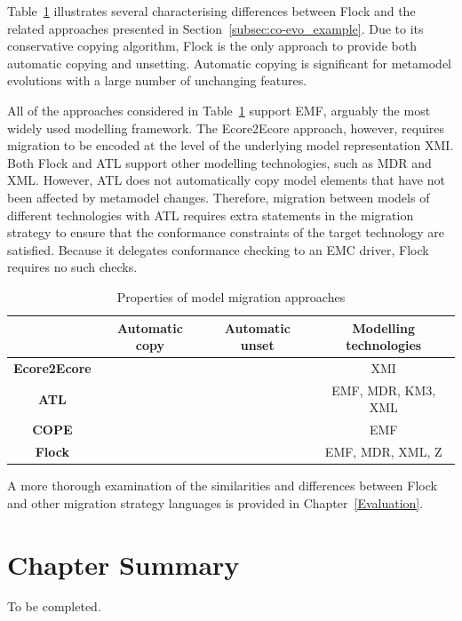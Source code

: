 Table~\ref{tab:differences} illustrates several characterising differences between Flock and the related approaches presented in Section~\ref{subsec:co-evo_example}. Due to its conservative copying algorithm, Flock is the only approach to provide both automatic copying and unsetting. Automatic copying is significant for metamodel evolutions with a large number of unchanging features.

All of the approaches considered in Table~\ref{tab:differences} support EMF, arguably the most widely used modelling framework. The Ecore2Ecore approach, however, requires migration to be encoded at the level of the underlying model representation XMI. Both Flock and ATL support other modelling technologies, such as MDR and XML. However, ATL does not automatically copy model elements that have not been affected by metamodel changes. Therefore, migration between models of different technologies with ATL requires extra statements in the migration strategy to ensure that the conformance constraints of the target technology are satisfied. Because it delegates conformance checking to an EMC driver, Flock requires no such checks.

\begin{table}[b]
	\caption{Properties of model migration approaches}
	\centering
	\begin{tabular}{|c|c|c|c|}
		\hline
		             & \textbf{Automatic copy} & \textbf{Automatic unset} & \textbf{Modelling technologies} \\
		\hline
		\textbf{Ecore2Ecore}  & \tick             & \cross              & XMI                    \\
		\hline
		\textbf{ATL}          & \cross            & \tick               & EMF, MDR, KM3, XML     \\
		\hline
		\textbf{COPE}         & \tick             & \cross              & EMF                    \\
		\hline
		\textbf{Flock}        & \tick             & \tick               & EMF, MDR, XML, Z       \\
		\hline
	\end{tabular}
	\label{tab:differences}
\end{table}

A more thorough examination of the similarities and differences between Flock and other migration strategy languages is provided in Chapter~\ref{Evaluation}.


\section{Chapter Summary}
To be completed.
